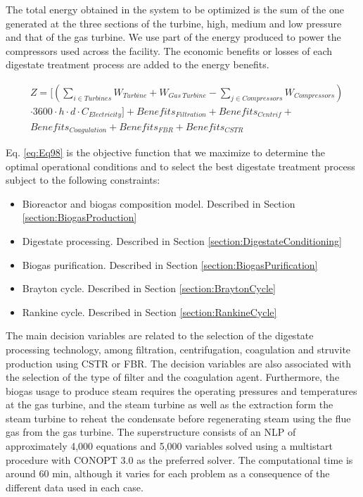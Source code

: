\begin{refsection}[referencesCh2]
The total energy obtained in the system to be optimized is the sum of the one generated at the three sections of the turbine, high, medium and low pressure and that of the gas turbine. We use part of the energy produced to power the compressors used across the facility. The economic benefits or losses of each digestate treatment process are added to the energy benefits.

\begin{align}
	&Z = \Bigg[ \left( \sum\limits_{i \in Turbines} {W}_{ {Turbine} }  + W_{Gas \ Turbine} - \sum\limits_{j \in Compressors} W_{Compressors}  \right) \label{eq:Eq98} \\ 
	& \cdot 3600\cdot h \cdot d \cdot {C_{Electricity}} \Bigg]+ Benefits_{Filtration} + {Benefits}_{Centrif} + \nonumber \\
	& {Benefits}_{Coagulation} + {Benefits}_{FBR} + {Benefits}_{CSTR} \nonumber
\end{align}

Eq. \ref{eq:Eq98} is the objective function that we maximize to determine the optimal operational conditions and to select the best digestate treatment process subject to the following constraints:

\begin{itemize}
	\item Bioreactor and biogas composition model. Described in Section \ref{section:BiogasProduction}
	\item Digestate processing. Described in Section \ref{section:DigestateConditioning}
	\item Biogas purification. Described in Section \ref{section:BiogasPurification}
	\item Brayton cycle. Described in Section \ref{section:BraytonCycle}
	\item Rankine cycle. Described in Section \ref{section:RankineCycle}
\end{itemize}

The main decision variables are related to the selection of the digestate processing technology, among filtration, centrifugation, coagulation and struvite production using CSTR or FBR. The decision variables are also associated with the selection of the type of filter and the coagulation agent. Furthermore, the biogas usage to produce steam requires the operating pressures and temperatures at the gas turbine, and the steam turbine as well as the extraction form the steam turbine to reheat the condensate before regenerating steam using the flue gas from the gas turbine. The superstructure consists of an NLP of approximately 4,000 equations and 5,000 variables solved using a multistart procedure with CONOPT 3.0 as the preferred solver. The computational time is around 60 min, although it varies for each problem as a consequence of the different data used in each case.


\end{refsection}
